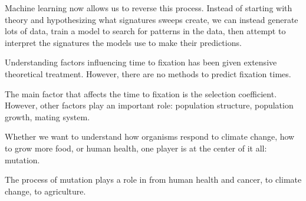Machine learning now allows us to reverse this process. Instead of starting with theory and hypothesizing what signatures sweeps create, we can instead generate lots of data, train a model to search for patterns in the data, then attempt to interpret the signatures the models use to make their predictions.

Understanding factors influencing time to fixation has been given extensive theoretical treatment. However, there are no methods to predict fixation times.

The main factor that affects the time to fixation is the selection coefficient. However, other factors play an important role: population structure, population growth, mating system.


Whether we want to understand how organisms respond to climate change, how to grow more food, or human health, one player is at the center of it all: mutation. 

The process of mutation plays a role in from human health and cancer, to climate change, to agriculture. 